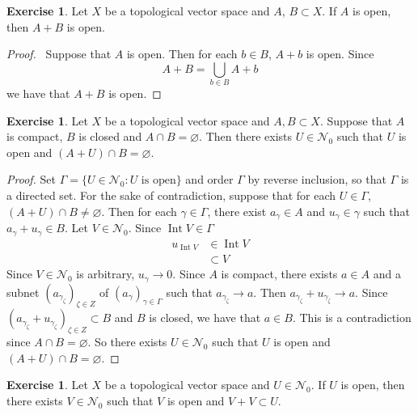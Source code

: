 \documentclass[12pt]{amsart}
\theoremstyle{definition}
\newtheorem{ex}[definition]{Exercise}
\newcommand{\gam}{\gamma}
\newcommand{\Gam}{\Gamma}
\newcommand{\ze}{\zeta}
\newcommand{\MN}{\mathcal{N}}
\DeclareMathOperator{\Int}{Int}
\begin{document}
	\begin{ex}
		Let $X$ be a topological vector space and $A$, $B \subset X$. If $A$ is open, then $A + B$ is open.
	\end{ex}
	
	\begin{proof} \
		Suppose that $A$ is open. Then for each $b \in B$, $A + b$ is open. Since 
		$$A + B = \bigcup_{b \in B} A + b$$
		we have that $A + B$ is open.
	\end{proof}

	\begin{ex}
		Let $X$ be a topological vector space and $A,B \subset X$. Suppose that $A$ is compact, $B$ is closed and $A \cap B = \varnothing$. Then there exists $U \in \MN_0$ such that $U$ is open and $(A + U) \cap B = \varnothing$. 
	\end{ex}
	
	\begin{proof}
		Set $\Gam = \{U \in \MN_0: U \text{ is open}\}$ and order $\Gam$ by reverse inclusion, so that $\Gam$ is a directed set. For the sake of contradiction, suppose that for each $U \in \Gam$, $(A + U) \cap B \neq \varnothing$. Then for each $\gam \in \Gam$, there exist $a_{\gam} \in A$ and $u_{\gam} \in \gam$ such that $a_{\gam} + u_{\gam} \in B$. Let $V \in \MN_0$. Since $\Int V \in \Gam$
		\begin{align*}
			u_{\Int V} 
			& \in \Int V \\
			& \subset V
		\end{align*}
		Since $V \in \MN_0$ is arbitrary, $u_{\gam} \rightarrow 0$.  Since $A$ is compact, there exists $a \in A$ and a subnet $(a_{\gam_{\ze}})_{\ze \in Z}$ of $(a_{\gam})_{\gam \in \Gam}$ such that $a_{\gam_{\ze}} \rightarrow a$. Then $a_{\gam_{\ze}} + u_{\gam_{\ze}} \rightarrow a$. Since $(a_{\gam_{\ze}} + u_{\gam_{\ze}})_{\ze \in Z} \subset B$ and $B$ is closed, we have that $a \in B$. This is a contradiction since $A \cap B = \varnothing$. So there exists $U \in \MN_0$ such that $U$ is open and $(A+U) \cap B = \varnothing$.
	\end{proof}

	\begin{ex}
		Let $X$ be a topological vector space and $U \in \MN_0$. If $U$ is open, then there exists $V \in \MN_0$ such that $V$ is open and $V+V \subset U$.
	\end{ex}
\end{document}

